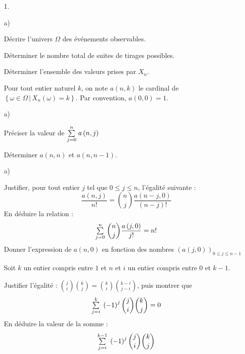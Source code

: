 \documentclass[11pt]{article}%
\begin{document}
\begin{noliste}{1.}
 \setlength{\itemsep}{4mm}
\item 
\begin{noliste}{a)}
 \setlength{\itemsep}{2mm}
\item Décrire l'univers $\Omega $ des événements observables.

\item Déterminer le nombre total de suites de tirages possibles.

\item Déterminer l'ensemble des valeurs prises par $X_{n}$.

\hspace{-1cm}Pour tout entier naturel $k$, on note $a\left( n,k\right)
$ le
cardinal de $\left\{ \omega \in \Omega \,\left| \,X_{n}\left( \omega
\right)
 = k\right. \right\} $. Par convention, $a\left( 0,0\right) = 1$.
\end{noliste}

\item 
\begin{noliste}{a)}
 \setlength{\itemsep}{2mm}
\item Préciser la valeur de ${\textstyle\sum\limits_{j = 0}^{n}}\hspace{.1cm}a\left( n,j\right) $

\item Déterminer $a\left( n,n\right) $ et $a\left( n,n-1\right) $.
\end{noliste}

\item 
\begin{noliste}{a)}
 \setlength{\itemsep}{2mm}
\item Justifier, pour tout entier $j$ tel que $0\leq j\leq n$,
l'égalité suivante : 
\[
\frac{a\left( n,j\right) }{n!} = \binom{n}{j}\frac{a\left( n-j,0\right)
}{\left( n-j\right) !}
\]
En déduire la relation : 
\[
{\textstyle\sum\limits_{j = 0}^{n}}\hspace{.1cm}\binom{n}{j}\frac{a\left( j,0\right) }{j!} = n!
\]
Donner l'expression de $a\left( n,0\right) $ en fonction des nombres
$\left(
a\left( j,0\right) \right)_{0\leq j\leq n-1}$

\item Soit $k$ un entier compris entre $1$ et $n$ et $i$ un entier
compris
entre $0$ et $k-1$.

Justifier l'égalité : $\binom{j}{i}\binom{k}{j} =
\binom{k}{i}\binom{k-i}{j-i}$, puis montrer que 
\[
{\textstyle\sum\limits_{j = i}^{k}}\hspace{.1cm}\left( -1\right) ^{j}\binom{j}{i}\binom{k}{j} = 0
\]
En déduire la valeur de la somme : 
\[
{\textstyle\sum\limits_{j = i}^{k-1}}\hspace{.1cm}\left( -1\right) ^{j}\binom{j}{i}\binom{k}{j}
\]
\end{noliste}


\end{noliste}
\end{document}
